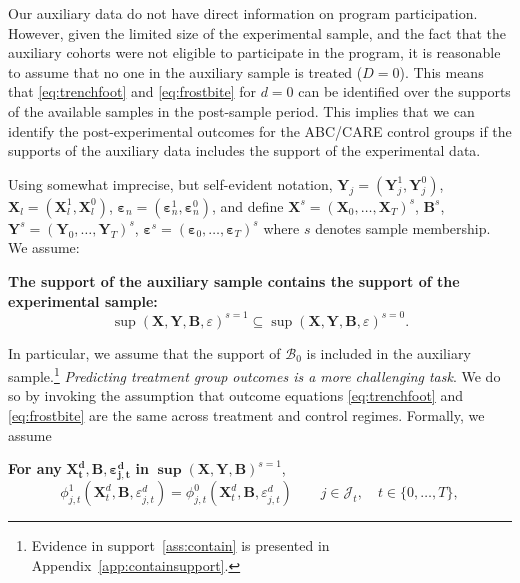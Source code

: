 Our auxiliary data do not have direct information on program participation. However, given the limited size of the experimental sample, and the fact that the auxiliary cohorts were not eligible to participate in the program, it is reasonable to assume that no one in the auxiliary sample is treated ($D=0$). This means that \eqref{eq:trenchfoot} and \eqref{eq:frostbite} for $d=0$ can be identified over the supports of the available samples in the post-sample period. This implies that we can identify the post-experimental outcomes for the ABC/CARE control groups if the supports of the auxiliary data includes the support of the experimental data.

Using somewhat imprecise, but self-evident notation, $\bm{Y}_j = (\bm{Y}^1_j, \bm{Y}^0_j)$, $\bm{X}_l = (\bm{X}^1_l, \bm{X}^0_l)$, $\bm{\varepsilon}_n = (\bm{\varepsilon}^1_n, \bm{\varepsilon}^0_n)$, and define $\bm{X}^s = (\bm{X}_0,\dots,\bm{X}_T)^s$, $\bm{B}^s$, $\bm{Y}^s = (\bm{Y}_0,\dots,\bm{Y}_T)^s$, $\bm{\varepsilon}^s = (\bm{\varepsilon}_0,\dots,\bm{\varepsilon}_{T})^s$ where $s$ denotes sample membership. We assume:

\onehalfspacing
\begin{assumption} \label{ass:contain} \textbf{The support of the auxiliary sample contains the support of the experimental sample:}
\begin{equation*}
\sup(\bm{X}, \bm{Y}, \bm{B}, \varepsilon)^{s=1} \subseteq \sup (\bm{X}, \bm{Y}, \bm{B}, \varepsilon)^{s=0}.
\end{equation*}
\end{assumption}
\doublespacing

In particular, we assume that the support of $\mathcal{B}_0$ is included in the auxiliary sample.\footnote{Evidence in support~\eqref{ass:contain} is presented in Appendix~\ref{app:containsupport}.} \textit{Predicting treatment group outcomes is a more challenging task}. We do so by invoking the assumption that outcome equations \eqref{eq:trenchfoot} and \eqref{eq:frostbite} are the same across treatment and control regimes. Formally, we assume

\onehalfspacing
\renewcommand\theassumption{A--\arabic{assumption}(a)}
\begin{assumption}\label{ass:eczema}
\textbf{For any} $\bm{X^d_t}, \bm{B}, \bm{\varepsilon^d_{j,t}}$ \textbf{in} $\bm{\sup}(\bm{X},\bm{Y},\bm{B})^{s=1}$,
\begin{equation*}
\phi^1_{j,t} (\bm{X}^d_t, \bm{B}, \varepsilon^d_{j,t}) = \phi^0_{j,t} (\bm{X}^d_t, \bm{B}, \varepsilon^d_{j,t}) \qquad j \in \mathcal J_t, \quad t \in \{0,\dots,T\},
\end{equation*}
\end{assumption}
\doublespacing

